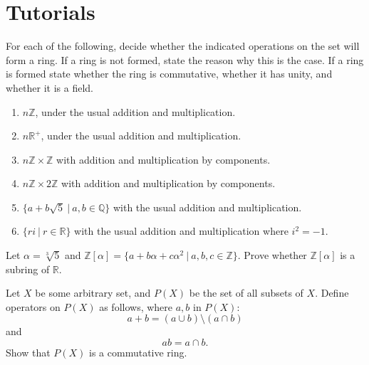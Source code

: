 \section*{Tutorials}

\begin{mdframed}
    \vspace{-0.25cm}
    \hspace{-0.25cm}
    \begin{Exercise}
        For each of the following, decide whether the indicated operations on the set will form a ring. If a ring is not formed, 
        state the reason why this is the case. If a ring is formed state whether the ring is commutative, whether it has unity, 
        and whether it is a field. 
        \begin{enumerate}
            \item $n\mathbb{Z}$, under the usual addition and multiplication.
            \item $n\mathbb{R}^+$, under the usual addition and multiplication.
            \item $n\mathbb{Z} \times \mathbb{Z}$ with addition and multiplication by components.
            \item $n\mathbb{Z} \times 2\mathbb{Z}$ with addition and multiplication by components.
            \item $\{ a + b\sqrt{5} \> | \> a,b \in \mathbb{Q} \}$ with the usual addition and multiplication.
            \item $\{ ri \> | \> r \in \mathbb{R} \}$ with the usual addition and multiplication where $i^2 = -1$.
        \end{enumerate}
    \end{Exercise}

    \vspace{0.752cm}
    \begin{Exercise}
        Let $\alpha = \sqrt[3]{5}$ and $\mathbb{Z}[\alpha] = \{ a + b\alpha + c\alpha^2 \> | \> a,b,c \in \mathbb{Z} \}$. Prove whether 
        $\mathbb{Z}[\alpha]$ is a subring of $\mathbb{R}$.
    \end{Exercise}

    \vspace{0.752cm}
    \begin{Exercise}
        Let $X$ be some arbitrary set, and $P(X)$ be the set of all subsets of $X$. Define operators on $P(X)$ as follows, 
        where $a,b$ in $P(X)$:
        \[
            a + b = (a \cup b) \setminus (a \cap b)
        \]
        and 
        \[
            ab = a \cap b.
        \]
        Show that $P(X)$ is a commutative ring.
    \end{Exercise}


\end{mdframed}
